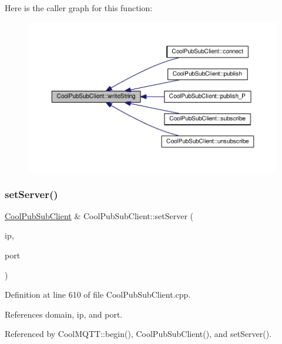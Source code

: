 Here is the caller graph for this function\+:
\nopagebreak
\begin{figure}[H]
\begin{center}
\leavevmode
\includegraphics[width=350pt]{d8/d4b/class_cool_pub_sub_client_a0e3d7e776d4cf4427f9569b28868905a_icgraph}
\end{center}
\end{figure}
\mbox{\label{class_cool_pub_sub_client_a947e70c394c66c7d08d0c53caf8425e3}} 
\subsubsection{\texorpdfstring{set\+Server()}{setServer()}\hspace{0.1cm}{\footnotesize\ttfamily [1/3]}}
{\footnotesize\ttfamily \hyperlink{class_cool_pub_sub_client}{Cool\+Pub\+Sub\+Client} \& Cool\+Pub\+Sub\+Client\+::set\+Server (\begin{DoxyParamCaption}\item[{I\+P\+Address}]{ip,  }\item[{uint16\+\_\+t}]{port }\end{DoxyParamCaption})}



Definition at line 610 of file Cool\+Pub\+Sub\+Client.\+cpp.



References domain, ip, and port.



Referenced by Cool\+M\+Q\+T\+T\+::begin(), Cool\+Pub\+Sub\+Client(), and set\+Server().

